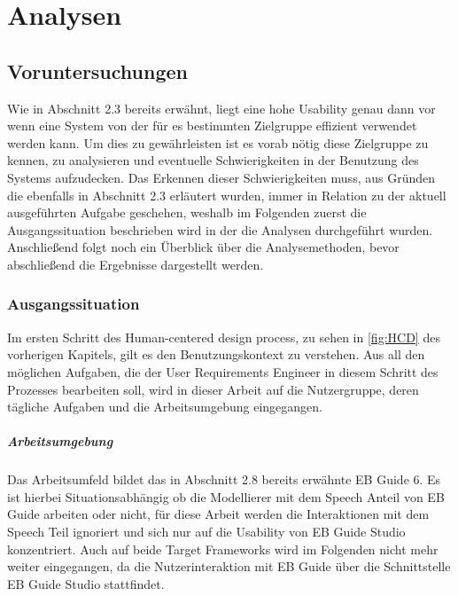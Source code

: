 \chapter{Analysen}\label{ch:method}

\section {Voruntersuchungen}
Wie in Abschnitt 2.3 bereits erwähnt, liegt eine hohe Usability genau dann vor wenn eine System von der für es bestimmten Zielgruppe effizient verwendet werden kann.\cite{Richter.2016}
Um dies zu gewährleisten ist es vorab nötig diese Zielgruppe zu kennen, zu analysieren und eventuelle Schwierigkeiten in der Benutzung des Systems aufzudecken.
Das Erkennen dieser Schwierigkeiten muss, aus Gründen die ebenfalls in Abschnitt 2.3 erläutert wurden, immer in Relation zu der aktuell ausgeführten Aufgabe geschehen, weshalb im Folgenden zuerst die Ausgangssituation beschrieben wird in der die Analysen durchgeführt wurden.
Anschließend folgt noch ein Überblick über die Analysemethoden, bevor abschließend die Ergebnisse dargestellt werden.

\subsection{Ausgangssituation}
Im ersten Schritt des Human-centered design process, zu sehen in \cref{fig:HCD} des vorherigen Kapitels, gilt es den Benutzungskontext zu verstehen.
Aus all den möglichen Aufgaben, die der User Requirements Engineer in diesem Schritt des Prozesses bearbeiten soll, wird in dieser Arbeit auf die Nutzergruppe, deren tägliche Aufgaben und die Arbeitsumgebung eingegangen.

\paragraph{Arbeitsumgebung}
Das Arbeitsumfeld bildet das in Abschnitt 2.8 bereits erwähnte EB Guide 6.
Es ist hierbei Situationsabhängig ob die Modellierer mit dem Speech Anteil von EB Guide arbeiten oder nicht, für diese Arbeit werden die Interaktionen mit dem Speech Teil ignoriert und sich nur auf die Usability von EB Guide Studio konzentriert.
Auch auf beide Target Frameworks wird im Folgenden nicht mehr weiter eingegangen, da die Nutzerinteraktion mit EB Guide über die Schnittstelle EB Guide Studio stattfindet.


